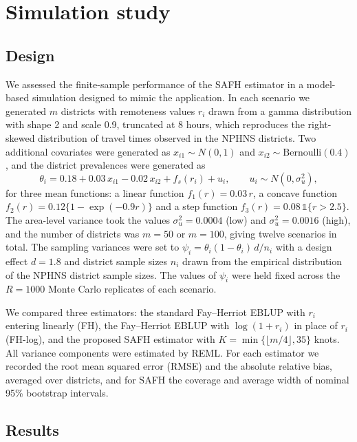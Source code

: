 \section{Simulation study}
\label{sec:simulation}

\subsection{Design}

We assessed the finite-sample performance of the SAFH estimator in a
model-based simulation designed to mimic the application. In each scenario we
generated $m$ districts with remoteness values $r_i$ drawn from a gamma
distribution with shape 2 and scale 0.9, truncated at 8 hours, which reproduces
the right-skewed distribution of travel times observed in the NPHNS districts.
Two additional covariates were generated as $x_{i1} \sim N(0, 1)$ and
$x_{i2} \sim \mathrm{Bernoulli}(0.4)$, and the district prevalences were
generated as
\begin{equation}
  \theta_i = 0.18 + 0.03\, x_{i1} - 0.02\, x_{i2} + f_s(r_i) + u_i,
  \qquad u_i \sim N(0, \sigma_u^2),
  \label{eq:sim}
\end{equation}
for three mean functions: a linear function $f_1(r) = 0.03\, r$, a concave
function $f_2(r) = 0.12\{1 - \exp(-0.9 r)\}$ and a step function
$f_3(r) = 0.08\, \mathbb{1}\{r > 2.5\}$. The area-level variance took the values
$\sigma_u^2 = 0.0004$ (low) and $\sigma_u^2 = 0.0016$ (high), and the number of
districts was $m = 50$ or $m = 100$, giving twelve scenarios in total. The
sampling variances were set to $\psi_i = \theta_i(1 - \theta_i)\, d / n_i$ with
a design effect $d = 1.8$ and district sample sizes $n_i$ drawn from the
empirical distribution of the NPHNS district sample sizes. The values of
$\psi_i$ were held fixed across the $R = 1000$ Monte Carlo replicates of each
scenario.

We compared three estimators: the standard Fay--Herriot EBLUP with $r_i$
entering linearly (FH), the Fay--Herriot EBLUP with $\log(1 + r_i)$ in place of
$r_i$ (FH-log), and the proposed SAFH estimator with $K = \min\{\lfloor m/4 \rfloor, 35\}$ knots.
All variance components were estimated by REML. For each estimator we recorded
the root mean squared error (RMSE) and the absolute relative bias, averaged over
districts, and for SAFH the coverage and average width of nominal 95\% bootstrap
intervals.

\subsection{Results}

